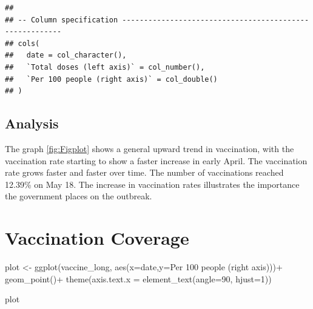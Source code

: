 \documentclass[11pt,a4paper,]{article}
\newenvironment{Shaded}{\begin{snugshade}}{\end{snugshade}}
\newcommand{\AttributeTok}[1]{\textcolor[rgb]{0.77,0.63,0.00}{#1}}
\newcommand{\DecValTok}[1]{\textcolor[rgb]{0.00,0.00,0.81}{#1}}
\newcommand{\FunctionTok}[1]{\textcolor[rgb]{0.00,0.00,0.00}{#1}}
\newcommand{\NormalTok}[1]{#1}
\newcommand{\OtherTok}[1]{\textcolor[rgb]{0.56,0.35,0.01}{#1}}
\newcommand{\SpecialCharTok}[1]{\textcolor[rgb]{0.00,0.00,0.00}{#1}}
\newcommand{\StringTok}[1]{\textcolor[rgb]{0.31,0.60,0.02}{#1}}
\begin{document}
\begin{verbatim}
## 
## -- Column specification --------------------------------------------------------
## cols(
##   date = col_character(),
##   `Total doses (left axis)` = col_number(),
##   `Per 100 people (right axis)` = col_double()
## )
\end{verbatim}

\begin{Shaded}
\end{Shaded}

\hypertarget{analysis-6}{%
\subsection{Analysis}\label{analysis-6}}

The graph \ref{fig:Figplot} shows a general upward trend in vaccination, with the vaccination rate starting to show a faster increase in early April. The vaccination rate grows faster and faster over time. The number of vaccinations reached 12.39\% on May 18. The increase in vaccination rates illustrates the importance the government places on the outbreak.

\hypertarget{vaccination-coverage}{%
\section{Vaccination Coverage}\label{vaccination-coverage}}

\begin{Shaded}
\begin{Highlighting}[]
\NormalTok{  plot }\OtherTok{\textless{}{-}} \FunctionTok{ggplot}\NormalTok{(vaccine\_long,}
         \FunctionTok{aes}\NormalTok{(}\AttributeTok{x=}\NormalTok{date,}\AttributeTok{y=}\StringTok{\textasciigrave{}}\AttributeTok{Per 100 people (right axis)}\StringTok{\textasciigrave{}}\NormalTok{))}\SpecialCharTok{+}
  \FunctionTok{geom\_point}\NormalTok{()}\SpecialCharTok{+}
 \FunctionTok{theme}\NormalTok{(}\AttributeTok{axis.text.x =} \FunctionTok{element\_text}\NormalTok{(}\AttributeTok{angle=}\DecValTok{90}\NormalTok{, }\AttributeTok{hjust=}\DecValTok{1}\NormalTok{))}


\NormalTok{plot}
\end{Highlighting}
\end{Shaded}
\end{document}
